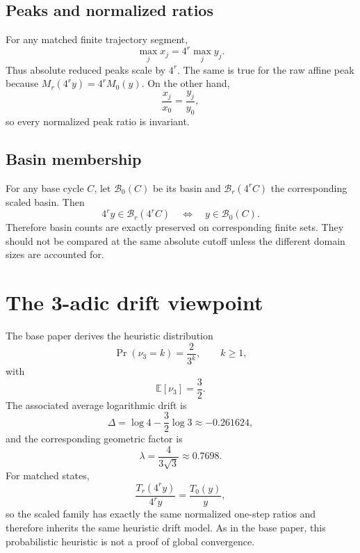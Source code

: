\documentclass[11pt]{article}
\newcommand{\vthree}{\nu_3}
\begin{document}
\subsection{Peaks and normalized ratios}
For any matched finite trajectory segment,
\begin{equation}
\max_j x_j=4^r\max_j y_j.
\end{equation}
Thus absolute reduced peaks scale by $4^r$. The same is true for the raw affine peak because $M_r(4^ry)=4^rM_0(y)$. On the other hand,
\begin{equation}
\frac{x_j}{x_0}=\frac{y_j}{y_0},
\end{equation}
so every normalized peak ratio is invariant.

\subsection{Basin membership}
For any base cycle $C$, let $\mathcal B_0(C)$ be its basin and $\mathcal B_r(4^rC)$ the corresponding scaled basin. Then
\begin{equation}
4^ry\in\mathcal B_r(4^rC)
\quad\Longleftrightarrow\quad
y\in\mathcal B_0(C).
\label{eq:basins}
\end{equation}
Therefore basin counts are exactly preserved on corresponding finite sets. They should not be compared at the same absolute cutoff unless the different domain sizes are accounted for.

\section{The 3-adic drift viewpoint}
The base paper derives the heuristic distribution
\begin{equation}
\Pr(\vthree=k)=\frac{2}{3^k},\qquad k\ge1,
\end{equation}
with
\[
\mathbb E[\vthree]=\frac32.
\]
The associated average logarithmic drift is
\begin{equation}
\Delta=\log4-\frac32\log3\approx-0.261624,
\end{equation}
and the corresponding geometric factor is
\begin{equation}
\lambda=\frac{4}{3\sqrt3}\approx0.7698.
\end{equation}
For matched states,
\begin{equation}
\frac{T_r(4^ry)}{4^ry}=\frac{T_0(y)}{y},
\end{equation}
so the scaled family has exactly the same normalized one-step ratios and therefore inherits the same heuristic drift model. As in the base paper, this probabilistic heuristic is not a proof of global convergence.
\end{document}
